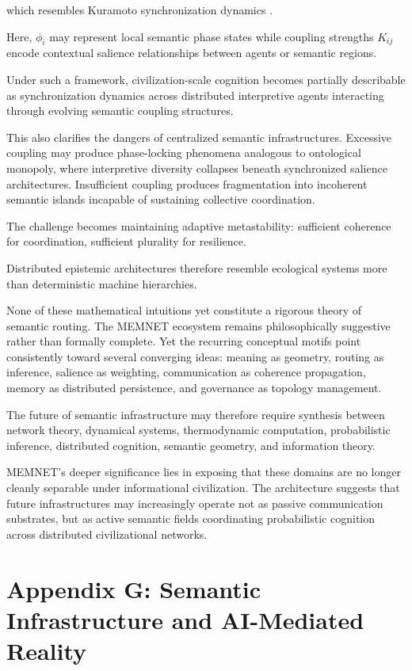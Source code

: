 \documentclass[11pt,a4paper]{article}
\begin{document}
which resembles Kuramoto synchronization dynamics \cite{bonabeau1999}.

Here, $\phi_i$ may represent local semantic phase states while coupling strengths $K_{ij}$ encode contextual salience relationships between agents or semantic regions.

Under such a framework, civilization-scale cognition becomes partially describable as synchronization dynamics across distributed interpretive agents interacting through evolving semantic coupling structures.

This also clarifies the dangers of centralized semantic infrastructures. Excessive coupling may produce phase-locking phenomena analogous to ontological monopoly, where interpretive diversity collapses beneath synchronized salience architectures. Insufficient coupling produces fragmentation into incoherent semantic islands incapable of sustaining collective coordination.

The challenge becomes maintaining adaptive metastability: sufficient coherence for coordination, sufficient plurality for resilience.

Distributed epistemic architectures therefore resemble ecological systems more than deterministic machine hierarchies.

None of these mathematical intuitions yet constitute a rigorous theory of semantic routing. The MEMNET ecosystem remains philosophically suggestive rather than formally complete. Yet the recurring conceptual motifs point consistently toward several converging ideas: meaning as geometry, routing as inference, salience as weighting, communication as coherence propagation, memory as distributed persistence, and governance as topology management.

The future of semantic infrastructure may therefore require synthesis between network theory, dynamical systems, thermodynamic computation, probabilistic inference, distributed cognition, semantic geometry, and information theory.

MEMNET's deeper significance lies in exposing that these domains are no longer cleanly separable under informational civilization. The architecture suggests that future infrastructures may increasingly operate not as passive communication substrates, but as active semantic fields coordinating probabilistic cognition across distributed civilizational networks.

\section{Appendix G: Semantic Infrastructure and AI-Mediated Reality}
\end{document}
